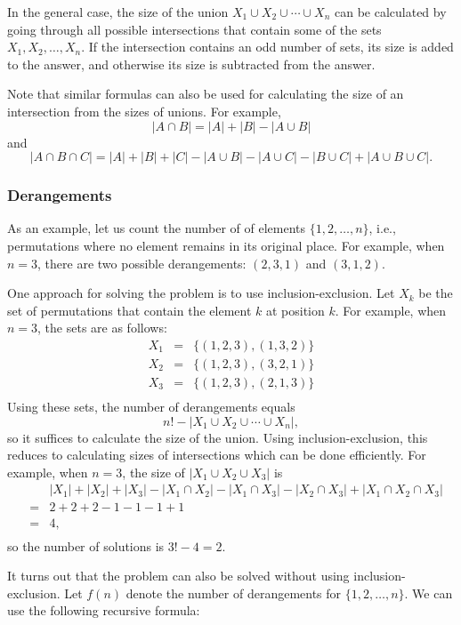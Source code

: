 In the general case, the size of the 
union $X_1 \cup X_2 \cup \cdots \cup X_n$
can be calculated by going through all possible
intersections that contain some of the sets $X_1,X_2,\ldots,X_n$.
If the intersection contains an odd number of sets,
its size is added to the answer,
and otherwise its size is subtracted from the answer.

Note that similar formulas can also be used
for calculating
the size of an intersection from the sizes of
unions. For example,
\[ |A \cap B| = |A| + |B| - |A \cup B|\]
and
\[ |A \cap B \cap C| = |A| + |B| + |C| - |A \cup B|  - |A \cup C|  - |B \cup C| + |A \cup B \cup C| .\]

\subsubsection{Derangements}


As an example, let us count the number of 
of elements $\{1,2,\ldots,n\}$, i.e., permutations
where no element remains in its original place.
For example, when $n=3$, there are
two possible derangements: $(2,3,1)$ and $(3,1,2)$.

One approach for solving the problem is to use
inclusion-exclusion.
Let $X_k$ be the set of permutations
that contain the element $k$ at position $k$.
For example, when $n=3$, the sets are as follows:
\[
\begin{array}{lcl}
X_1 & = & \{(1,2,3),(1,3,2)\} \\
X_2 & = & \{(1,2,3),(3,2,1)\} \\
X_3 & = & \{(1,2,3),(2,1,3)\} \\
\end{array}
\]
Using these sets, the number of derangements equals
\[ n! - |X_1 \cup X_2 \cup \cdots \cup X_n|, \]
so it suffices to calculate the size of the union.
Using inclusion-exclusion, this reduces to
calculating sizes of intersections which can be
done efficiently.
For example, when $n=3$, the size of
$|X_1 \cup X_2 \cup X_3|$ is
\[
\begin{array}{lcl}
 & & |X_1| + |X_2| + |X_3| - |X_1 \cap X_2|  - |X_1 \cap X_3|  - |X_2 \cap X_3| + |X_1 \cap X_2 \cap X_3| \\
 & = & 2+2+2-1-1-1+1 \\
 & = & 4, \\
\end{array}
\]
so the number of solutions is $3!-4=2$.

It turns out that the problem can also be solved
without using inclusion-exclusion.
Let $f(n)$ denote the number of derangements
for $\{1,2,\ldots,n\}$. We can use the following
recursive formula:


